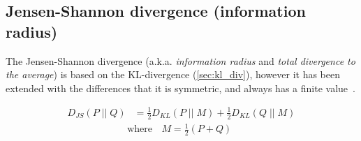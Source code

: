\newpage\subsection{Jensen-Shannon divergence (information radius)}

The Jensen-Shannon divergence (a.k.a. \textit{information radius} and
\textit{total divergence to the average}) is based on the KL-divergence
(\autoref{sec:kl_div}), however it has been extended with the differences that
it is symmetric, and always has a finite value~\cite{Endres2003, Fuglede2004}.


\begin{equation}
    \begin{aligned}
    D_{JS}(P\;||\;Q) &= \frac{1}{2}D_{KL}(P\;||\;M) + \frac{1}{2}D_{KL}(Q\;||\;M)
    \end{aligned}
\end{equation}
\begin{equation*}
    \text{where}\;\;
    \begin{aligned}
        M = \frac{1}{2}(P+Q)
    \end{aligned}
\end{equation*}